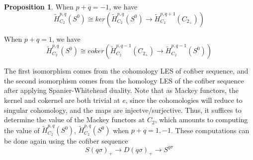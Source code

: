 \documentclass{article}
\theoremstyle{definition}
\newtheorem{proposition}[theorem]{Proposition}
\begin{document}
\begin{tcolorbox}[colback=blue!5!white,colframe=blue!30!white]
\begin{proposition}
When $p+q=-1$, we have 
\[\tilde{H}^{p,q}_{C_2}(S^0)\cong ker(\tilde{H}_{C_2}^{p,q}(S^0)\to \tilde{H}_{C_2}^{p,q+1}(C_{2_+}))\]

When $p+q=1$, we have 
\[\tilde{H}^{p,q}_{C_2}(S^0)\cong coker(\tilde{H}_{C_2}^{p,q-1}(C_{2_+})\to \tilde{H}_{C_2}^{p,q-1}(S^0))\]
\end{proposition}
\end{tcolorbox}
The first isomorphism comes from the cohomology LES of cofiber sequence, and the second isomorphism comes from the homology LES of the cofiber sequence after applying Spanier-Whitehead duality. Note that as Mackey functors, the kernel and cokernel are both trivial at $e$, since the cohomologies will reduce to singular cohomology, and the maps are injectve/surjective. Thus, it suffices to determine the value of the Mackey functors at $C_2$, which amounts to computing the value of $\tilde{H}^{p,q}_{C_2}(S^0)$, $\tilde{H}^{p,q}_{C_2}(S^0)$ when $p+q=1,-1$. These computations can be done again using the cofiber sequence 
\[S(q\sigma)_{+}\to D(q\sigma)_+\to S^{q\sigma}\]
\end{document}
